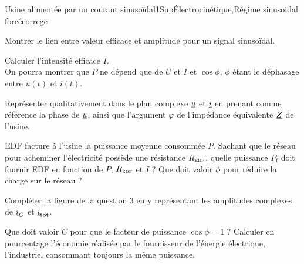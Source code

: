\begin{exercise}{Usine alimentée par un courant sinusoïdal}{1}{Sup}{\'Electrocinétique,Régime sinusoidal forcé}{correge}

\begin{questions}
    \questioncours Montrer le lien entre valeur efficace et amplitude pour un signal sinusoïdal.

    
    \question Calculer l'intensité efficace $I$. \\ On pourra montrer que $P$ ne dépend que de $U$ et $I$ et $\cos\phi$, $\phi$ étant le déphasage entre $u(t)$ et $i(t)$.


    \question Représenter qualitativement dans le plan complexe $\underline{u}$ et $\underline{i}$ en prenant comme référence la phase de $\underline{u}$, ainsi que l'argument $\varphi$ de l'impédance équivalente $\underline{Z}$ de l'usine.

    \question EDF facture à l'usine la puissance moyenne consommée $P$. Sachant que le réseau pour acheminer l'électricité possède une résistance $R_\textsc{edf}$, quelle puissance $P_\text{f}$ doit fournir EDF en fonction de $P$, $R_\textsc{edf}$ et $I$ ? Que doit valoir $\phi$ pour réduire la charge sur le réseau ?
    

    \question Compléter la figure de la question 3 en y représentant les amplitudes complexes de $\underline{i}_C$ et $\underline{i}_\text{tot}$.

    \question Que doit valoir $C$ pour que le facteur de puissance $\cos\phi = 1$ ? Calculer en pourcentage l'économie réalisée par le fournisseur de l'énergie électrique, l'industriel consommant toujours la même puissance.
\end{questions}
\end{exercise}

